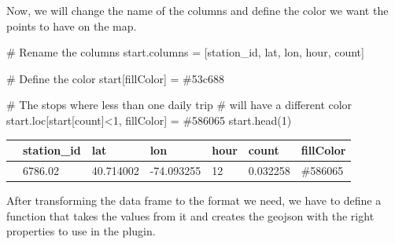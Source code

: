\documentclass[
  letterpaper,
  DIV=11,
  numbers=noendperiod]{scrreprt}
\newenvironment{Shaded}{\begin{snugshade}}{\end{snugshade}}
\newcommand{\CommentTok}[1]{\textcolor[rgb]{0.37,0.37,0.37}{#1}}
\newcommand{\DecValTok}[1]{\textcolor[rgb]{0.68,0.00,0.00}{#1}}
\newcommand{\NormalTok}[1]{\textcolor[rgb]{0.00,0.23,0.31}{#1}}
\newcommand{\OperatorTok}[1]{\textcolor[rgb]{0.37,0.37,0.37}{#1}}
\newcommand{\StringTok}[1]{\textcolor[rgb]{0.13,0.47,0.30}{#1}}
\begin{document}
Now, we will change the name of the columns and define the color we want
the points to have on the map.

\begin{Shaded}
\begin{Highlighting}[]
\CommentTok{\# Rename the columns}
\NormalTok{start.columns }\OperatorTok{=}\NormalTok{ [}\StringTok{\textquotesingle{}station\_id\textquotesingle{}}\NormalTok{, }\StringTok{\textquotesingle{}lat\textquotesingle{}}\NormalTok{, }\StringTok{\textquotesingle{}lon\textquotesingle{}}\NormalTok{, }\StringTok{\textquotesingle{}hour\textquotesingle{}}\NormalTok{, }\StringTok{\textquotesingle{}count\textquotesingle{}}\NormalTok{]}

\CommentTok{\# Define the color}
\NormalTok{start[}\StringTok{\textquotesingle{}fillColor\textquotesingle{}}\NormalTok{] }\OperatorTok{=} \StringTok{\textquotesingle{}\#53c688\textquotesingle{}}

\CommentTok{\# The stops where less than one daily trip}
\CommentTok{\# will have a different color}
\NormalTok{start.loc[start[}\StringTok{\textquotesingle{}count\textquotesingle{}}\NormalTok{]}\OperatorTok{\textless{}}\DecValTok{1}\NormalTok{, }\StringTok{\textquotesingle{}fillColor\textquotesingle{}}\NormalTok{] }\OperatorTok{=} \StringTok{\textquotesingle{}\#586065\textquotesingle{}}
\NormalTok{start.head(}\DecValTok{1}\NormalTok{)}
\end{Highlighting}
\end{Shaded}

\begin{longtable}[]{@{}lllllll@{}}
\toprule\noalign{}
& station\_id & lat & lon & hour & count & fillColor \\
\midrule\noalign{}
\endhead
\bottomrule\noalign{}
\endlastfoot
0 & 6786.02 & 40.714002 & -74.093255 & 12 & 0.032258 & \#586065 \\
\end{longtable}

After transforming the data frame to the format we need, we have to
define a function that takes the values from it and creates the geojson
with the right properties to use in the plugin.
\end{document}
